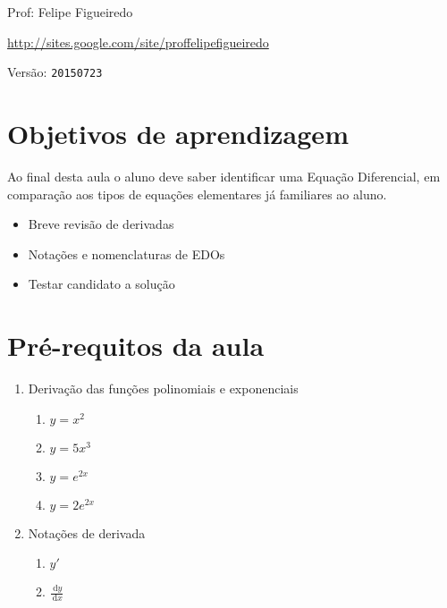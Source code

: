 \documentclass[a4paper]{article}
\newcommand{\ud}{\mathrm{\ d}}
\begin{document}
\parbox[c]{.825\textwidth}{\raggedright%
{Prof: Felipe Figueiredo\par}
{\url{http://sites.google.com/site/proffelipefigueiredo}\par}
}

Versão: \verb|20150723|



\section{Objetivos de aprendizagem}

Ao final desta aula o aluno deve saber identificar uma Equação
Diferencial, em comparação aos tipos de equações elementares já
familiares ao aluno.

\begin{itemize}
\item Breve revisão de derivadas
\item Notações e nomenclaturas de EDOs
\item Testar candidato a solução
\end{itemize}


\section{Pré-requitos da aula}

\begin{enumerate}
\item Derivação das funções polinomiais e exponenciais
  \begin{enumerate}
  \item $y=x^2$
  \item $y=5x^3$
  \item $y=e^{2x}$
  \item $y=2e^{2x}$
  \end{enumerate}
\item Notações de derivada
  \begin{enumerate}
  \item $y'$
  \item $\frac{\ud y}{\ud x}$
  \end{enumerate}
\end{enumerate}
\end{document}
